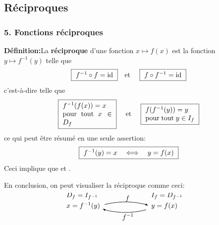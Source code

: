 \subsection{R\'eciproques} 

\begin{frame}
\frametitle{\bf 5. Fonctions r\'eciproques}
\medskip 

{\bf D\'efinition:}\quad La {\bf r\'eciproque} d'une fonction $x\mapsto f(x)$ 
est la fonction $y\mapsto f^{-1}(y)$ telle que 
$$
\mbox{
\framebox{\ $f^{-1}\circ f=\id$\ }\quad et \quad 
\framebox{\ $f\circ f^{-1}=\id$\ }
}
$$
c'est-\`a-dire telle que 
$$
\mbox{
\framebox{\ \parbox{2.5cm}{$f^{-1}(f(x))=x$ \\ pour tout $x\in D_f$}\ }
\quad et \quad 
\framebox{\ \parbox{2.5cm}{$f(f^{-1}(y))=y$ \\ pour tout $y\in I_f$}\ }
}
$$
\pause
ce qui peut \^etre r\'esum\'e en une seule assertion: 
$$
\mbox{
\framebox{\ $f^{-1}(y)=x \quad\Longleftrightarrow\quad y=f(x)$\ }
}
$$
\pause
Ceci implique que\quad 
{}\quad et \quad 
{}. 
\vspace*{2mm}

\pause
En conclusion, on peut visualiser la r\'eciproque comme ceci:
$$
\begin{picture}(120,30)(-55,-10)
\setlength{\unitlength}{1.5pt}
\put(-57,10){$D_f=I_{f^{-1}}$}
\put(-57,0){$x=f^{-1}(y)$}
\qbezier(-20,3)(0,8)(20,3)
\put(20,3){\vector(2,-1){2}}
\put(0,7){$f$}
\put(25,0){$y=f(x)$}
\put(25,10){$I_f=D_{f^{-1}}$}
\qbezier(-20,-2)(0,-7)(20,-2)
\put(-20,-2){\vector(-2,1){2}}
\put(-3,-11){$f^{-1}$}
\end{picture}
$$

\end{frame}


